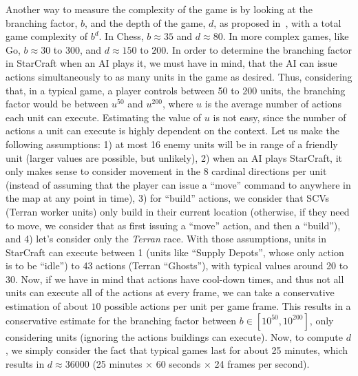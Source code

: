 \documentclass[journal]{IEEEtran}
\begin{document}
Another way  to measure the complexity of the game is  by looking at the branching factor, $b$, and the depth of the game, $d$, as proposed in~\cite{Gaby}, with a total game complexity of $b^d$. In Chess, $b \approx 35$ and $d \approx 80$. In more complex games, like Go, $b \approx 30$ to $300$, and $d \approx 150$ to $200$. In order to determine the branching factor in StarCraft when an AI plays it, we must have in mind, that the AI can issue actions simultaneously to as many units in the game as desired. Thus, considering that, in a typical game, a player controls between 50 to 200 units, the branching factor would be between $u^{50}$ and $u^{200}$, where $u$ is the average number of actions each unit can execute. 
Estimating the value of $u$ is not easy, since the number of actions a unit can execute is highly dependent on the context. Let us make the following assumptions: 1) at most 16 enemy units will be in range of a friendly unit (larger values are possible, but unlikely), 2) when an AI plays StarCraft, it only makes sense to consider movement in the 8 cardinal directions per unit (instead of assuming that the player can issue a ``move'' command to anywhere in the map at any point in time), 3) for ``build'' actions, we consider that SCVs (Terran worker units) only build in their current location (otherwise, if they need to move, we consider that as first issuing a ``move'' action, and then a ``build''), and 4) let's consider only the {\em Terran} race. With those assumptions, units in StarCraft can execute between 1 (units like ``Supply Depots'', whose only action is to be ``idle'') to 43 actions (Terran ``Ghosts''), with typical values around 20 to 30. Now, if we have in mind that actions have cool-down times, and thus not all units can execute all of the actions at every frame, we can take a conservative estimation of about $10$ possible actions per unit per game frame. This results in a conservative estimate for the branching factor between $b \in [10^{50},10^{200}]$, only considering units (ignoring the actions buildings can execute). 
Now, to compute $d$, we simply consider the fact that typical games last for about 25 minutes, which results in $d \approx 36000$ (25 minutes $\times$ 60 seconds $\times$ 24 frames per second).



\end{document}
